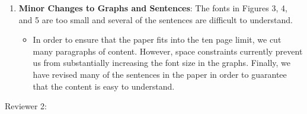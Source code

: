 \documentclass[11pt]{article}
\begin{document}
\begin{enumerate}
\begin{itemize}
    \end{itemize}

  \item {\bf Minor Changes to Graphs and Sentences}: The fonts in
    Figures 3, 4, and 5 are too small and several of the sentences are
    difficult to understand.

    \begin{itemize}
      
      \item In order to ensure that the paper fits into the ten page
        limit, we cut many paragraphs of content.  However, space
        constraints currently prevent us from substantially increasing
        the font size in the graphs.  Finally, we have revised many of
        the sentences in the paper in order to guarantee that the
        content is easy to understand.

    \end{itemize}

\end{enumerate}

\newpage

Reviewer 2: \vspace*{-.15in}
\renewcommand{\labelitemi}{$\rightarrow$}
\end{document}
